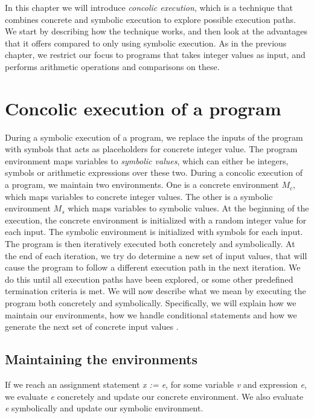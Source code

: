 In this chapter we will introduce \emph{concolic execution}, which is a technique that combines concrete and symbolic execution to explore possible execution paths. We start by describing how the technique works, and then look at the advantages that it offers compared to only using symbolic execution. As in the previous chapter, we restrict our focus to programs that takes integer values as input, and performs arithmetic operations and comparisons on these. 

\section{Concolic execution of a program}
	During a symbolic execution of a program, we replace the inputs of the program with symbols that acts as placeholders for concrete integer value. The program environment maps variables to \emph{symbolic values}, which can either be integers, symbols or arithmetic expressions over these two. During a concolic execution of a program, we maintain two environments. One is a concrete environment $M_c$, which maps variables to concrete integer values. The other is a symbolic environment $M_s$ which maps variables to symbolic values. At the beginning of the execution, the concrete environment is initialized with a random integer value for each input. The symbolic environment is initialized with symbols for each input. 
	The program is then iteratively executed both concretely and symbolically. At the end of each iteration, we try do determine a new set of input values, that will cause the program to follow a different execution path in the next iteration. We do this until all execution paths have been explored, or some other predefined termination criteria is met. We will now describe what we mean by executing the program both concretely and symbolically. Specifically, we will explain how we maintain our environments, how we handle conditional statements and how we generate the next set of concrete input values \cite{Godefroid:2005:DDA:1064978.1065036}.
	
	\subsection{Maintaining the environments} 
	
	If we reach an assignment statement \textsl{x := e}, for some variable \textsl{v} and expression \textsl{e}, we evaluate \textsl{e} concretely and update our concrete environment. We also evaluate \textsl{e} symbolically and update our symbolic environment. 
	
